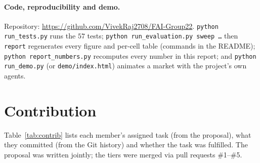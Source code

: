 \documentclass{article}
\theoremstyle{definition}
\begin{document}
\paragraph{Code, reproducibility and demo.} Repository:
\url{https://github.com/VivekRaj2708/FAI-Group22}. \texttt{python run\_tests.py} runs the $57$ tests;
\texttt{python run\_evaluation.py sweep \dots} then \texttt{report} regenerates every figure and per-cell table
(commands in the README); \texttt{python report\_numbers.py} recomputes every number in this report; and
\texttt{python run\_demo.py} (or \texttt{demo/index.html}) animates a market with the project's own agents.

\section{Contribution}\label{sec:contrib}
Table~\ref{tab:contrib} lists each member's assigned task (from the proposal), what they committed (from the Git
history) and whether the task was fulfilled. The proposal was written jointly; the tiers were merged via pull requests \#1--\#5.
\end{document}
